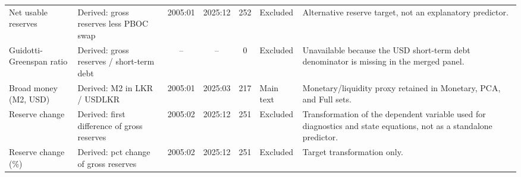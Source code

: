 \begin{longtable}{p{2.8cm}p{2.9cm}cccp{1.9cm}p{6.0cm}}
Net usable reserves & Derived: gross reserves less PBOC swap & 2005:01 & 2025:12 & 252 & Excluded & Alternative reserve target, not an explanatory predictor. \\
Guidotti-Greenspan ratio & Derived: gross reserves / short-term debt & -- & -- & 0 & Excluded & Unavailable because the USD short-term debt denominator is missing in the merged panel. \\
Broad money (M2, USD) & Derived: M2 in LKR / USDLKR & 2005:01 & 2025:03 & 217 & Main text & Monetary/liquidity proxy retained in Monetary, PCA, and Full sets. \\
Reserve change & Derived: first difference of gross reserves & 2005:02 & 2025:12 & 251 & Excluded & Transformation of the dependent variable used for diagnostics and state equations, not as a standalone predictor. \\
Reserve change (\%) & Derived: pct change of gross reserves & 2005:02 & 2025:12 & 251 & Excluded & Target transformation only. \\
\end{longtable}